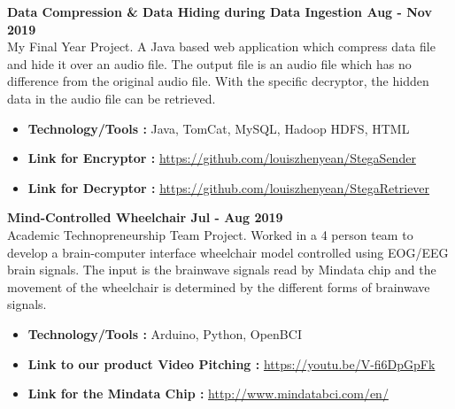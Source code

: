 \textbf{Data Compression \& Data Hiding during Data Ingestion \hfill Aug - Nov 2019} \vspace{0.1cm} \\
    My Final Year Project. A Java based web application which compress data file and hide it over an audio file. The output file is an audio file which has no difference from the original audio file. With the specific decryptor, the hidden data in the audio file can be retrieved. \vspace{0.3cm}
    \begin{itemize}
        \item \textbf{Technology/Tools :} Java, TomCat, MySQL, Hadoop HDFS, HTML
        \item \textbf{Link for Encryptor :} \url{https://github.com/louiszhenyean/StegaSender}
        \item \textbf{Link for Decryptor :} \url{https://github.com/louiszhenyean/StegaRetriever}
    \end{itemize}

\textbf{Mind-Controlled Wheelchair \hfill Jul - Aug 2019} \vspace{0.1cm} \\
    Academic Technopreneurship Team Project. Worked in a 4 person team to develop a brain-computer interface wheelchair model controlled using EOG/EEG brain signals. The input is the brainwave signals read by Mindata chip and the movement of the wheelchair is determined by the different forms of brainwave signals. \vspace{0.2cm}
    \begin{itemize}
        \item \textbf{Technology/Tools :} Arduino, Python, OpenBCI
        \item \textbf{Link to our product Video Pitching :} \url{https://youtu.be/V-fi6DpGpFk}
        \item \textbf{Link for the Mindata Chip :} \url{http://www.mindatabci.com/en/}
    \end{itemize}
